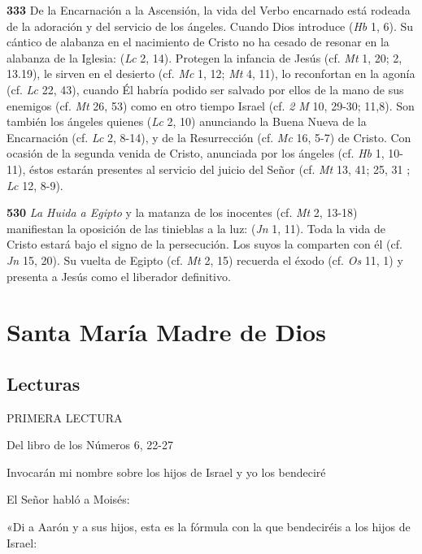 \textbf{333} De la Encarnación a la Ascensión, la vida del Verbo encarnado está rodeada de la adoración y del servicio de los ángeles. Cuando Dios introduce  (\emph{Hb} 1, 6). Su cántico de alabanza en el nacimiento de Cristo no ha cesado de resonar en la alabanza de la Iglesia:  (\emph{Lc} 2, 14). Protegen la infancia de Jesús (cf. \emph{Mt} 1, 20; 2, 13.19), le sirven en el desierto (cf. \emph{Mc} 1, 12; \emph{Mt} 4, 11), lo reconfortan en la agonía (cf. \emph{Lc} 22, 43), cuando Él habría podido ser salvado por ellos de la mano de sus enemigos (cf. \emph{Mt} 26, 53) como en otro tiempo Israel (cf. \emph{2 M} 10, 29-30; 11,8). Son también los ángeles quienes  (\emph{Lc} 2, 10) anunciando la Buena Nueva de la Encarnación (cf. \emph{Lc} 2, 8-14), y de la Resurrección (cf. \emph{Mc} 16, 5-7) de Cristo. Con ocasión de la segunda venida de Cristo, anunciada por los ángeles (cf. \emph{Hb} 1, 10-11), éstos estarán presentes al servicio del juicio del Señor (cf. \emph{Mt} 13, 41; 25, 31 ; \emph{Lc} 12, 8-9).

\textbf{530} \emph{La Huida a Egipto} y la matanza de los inocentes (cf. \emph{Mt} 2, 13-18) manifiestan la oposición de las tinieblas a la luz:  (\emph{Jn} 1, 11). Toda la vida de Cristo estará bajo el signo de la persecución. Los suyos la comparten con él (cf. \emph{Jn} 15, 20). Su vuelta de Egipto (cf. \emph{Mt} 2, 15) recuerda el éxodo (cf. \emph{Os} 11, 1) y presenta a Jesús como el liberador definitivo.



\chapter{Santa María Madre de Dios}

\section{Lecturas}

PRIMERA LECTURA

Del libro de los Números 6, 22-27

Invocarán mi nombre sobre los hijos de Israel y yo los bendeciré

El Señor habló a Moisés:

«Di a Aarón y a sus hijos, esta es la fórmula con la que bendeciréis a
los hijos de Israel:

